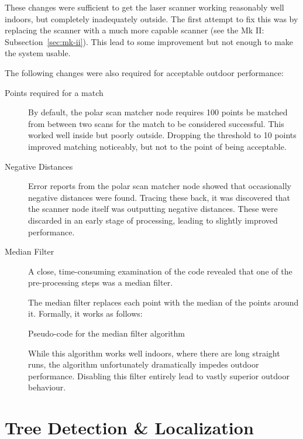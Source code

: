 \documentclass[12pt,oneside,a4paper]{book}
\begin{document}
These changes were sufficient to get the laser scanner working
reasonably well indoors, but completely inadequately outside. The
first attempt to fix this was by replacing the scanner with a much
more capable scanner (see the Mk II: Subsection~\ref{sec:mk-ii}). This
lead to some improvement but not enough to make the system usable.

The following changes were also required for acceptable outdoor
performance:

\begin{description}
\item[Points required for a match] By default, the polar scan matcher
  node requires 100 points be matched from between two scans for the
  match to be considered successful. This worked well inside but
  poorly outside. Dropping the threshold to 10
  points improved matching noticeably, but not to the point of being
  acceptable.
\item[Negative Distances] Error reports from the polar scan matcher node
  showed that occasionally negative distances were found. Tracing
  these back, it was discovered that the scanner node itself was
  outputting negative distances. These were discarded in an early
  stage of processing, leading to slightly improved performance.
\item[Median Filter] A close, time-consuming examination of the code
  revealed that one of the pre-processing steps was a median filter.

  The median filter replaces each point with the median of the points
  around it. Formally, it works as follows:
  \IncMargin{1em}
  \begin{algorithm}
    \BlankLine
    \caption{Pseudo-code for the median filter algorithm}
  \end{algorithm}

  While this algorithm works well indoors, where there are long
  straight runs, the algorithm unfortunately dramatically
  impedes outdoor performance. Disabling this filter entirely lead to
  vastly superior outdoor behaviour.
\end{description}


\section{Tree Detection \& Localization}
\label{sec:tree-detection-localization}
\end{document}
